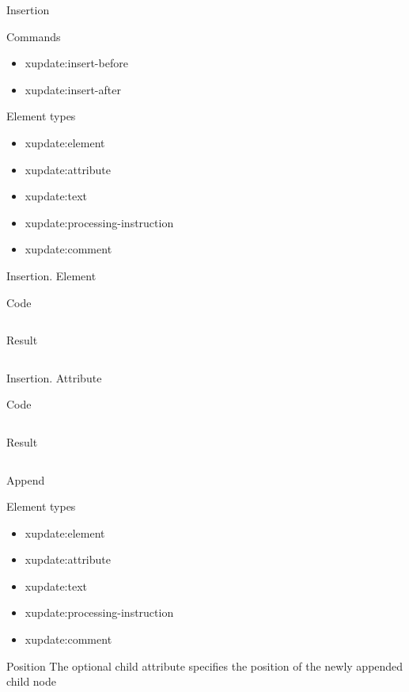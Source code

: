 \documentclass[sans]{beamer}
\begin{document}
\begin{frame}{Insertion}
	\begin{block}{Commands}
	\begin{itemize}
		\item xupdate:insert-before
		\item xupdate:insert-after
	\end{itemize}
	\end{block}

	\begin{block}{Element types}
	\begin{itemize}
		\item xupdate:element
		\item xupdate:attribute
		\item xupdate:text
		\item xupdate:processing-instruction
		\item xupdate:comment
	\end{itemize}
	\end{block}
\end{frame}

\begin{frame}{Insertion. Element}
	\begin{block}{Code}
		\inputminted[fontsize=\footnotesize]{xml}{codes/ex10.xml}
	\end{block}
	\begin{block}{Result}
		\inputminted[fontsize=\footnotesize]{xml}{codes/ex11.xml}
	\end{block}
\end{frame}

\begin{frame}{Insertion. Attribute}
	\begin{block}{Code}
		\inputminted[fontsize=\tiny]{xml}{codes/ex12.xml}
	\end{block}
	\begin{block}{Result}
		\inputminted[fontsize=\footnotesize]{xml}{codes/ex13.xml}
	\end{block}
\end{frame}


\begin{frame}{Append}
	\begin{block}{Element types}
	\begin{itemize}
		\item xupdate:element
		\item xupdate:attribute
		\item xupdate:text
		\item xupdate:processing-instruction
		\item xupdate:comment
	\end{itemize}
	\end{block}

	\begin{block}{Position}
		The optional child attribute specifies the position of the newly appended child node
	\end{block}
\end{frame}
\end{document}
